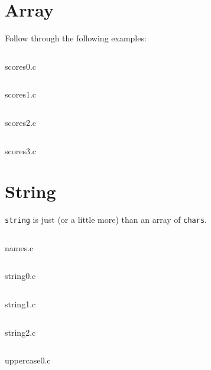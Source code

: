 \section{Array}
Follow through the following examples:
\begin{listing}[htbp!]
    \inputminted[linenos]{c}{codes/src2/scores0.c}
    \caption{scores0.c}
\end{listing}

\begin{listing}[htbp!]
    \inputminted[linenos]{c}{codes/src2/scores1.c}
    \caption{scores1.c}
\end{listing}

\begin{listing}[htbp!]
    \inputminted[linenos]{c}{codes/src2/scores2.c}
    \caption{scores2.c}
\end{listing}

\begin{listing}[htbp!]
    \inputminted[linenos]{c}{codes/src2/scores3.c}
    \caption{scores3.c}
\end{listing}

\section{String}
\texttt{string} is just (or a little more) than an array of \texttt{chars}.

\begin{listing}[!htbp]
    \inputminted[linenos]{c}{codes/src2/names.c}
    \caption{names.c}
\end{listing}

\begin{listing}[!htbp]
    \inputminted[linenos]{c}{codes/src2/string0.c}
    \caption{string0.c}
\end{listing}

\begin{listing}[!htbp]
    \inputminted[linenos]{c}{codes/src2/string1.c}
    \caption{string1.c}
\end{listing}

\begin{listing}[!htbp]
    \inputminted[linenos]{c}{codes/src2/string2.c}
    \caption{string2.c}
\end{listing}

\begin{listing}[!htbp]
    \inputminted[linenos]{c}{codes/src2/uppercase0.c}
    \caption{uppercase0.c}
\end{listing}

